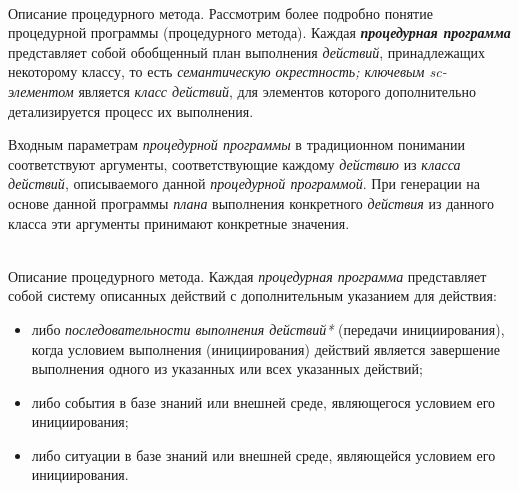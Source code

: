 \begin{frame}{\\Описание процедурного метода.}
	\topline
	\justifying
    Рассмотрим более подробно понятие процедурной программы (процедурного метода). Каждая \textbf{\textit{процедурная программа}} представляет собой обобщенный план выполнения \textit{действий}, принадлежащих некоторому классу, то есть \textit{семантическую окрестность; ключевым sc-элементом\scnrolesign} является \textit{класс действий}, для элементов которого дополнительно детализируется процесс их выполнения.
    
    Входным параметрам \textit{процедурной программы} в традиционном понимании соответствуют аргументы, соответствующие каждому \textit{действию} из \textit{класса действий}, описываемого данной \textit{процедурной программой}. При генерации на основе данной программы \textit{плана} выполнения конкретного \textit{действия} из данного класса эти аргументы принимают конкретные значения.
\end{frame}

\begin{frame}{\\Описание процедурного метода.}
	\topline
	\justifying
     Каждая \textit{процедурная программа} представляет собой систему описанных действий с дополнительным указанием для действия:
    \begin{itemize}
        \item либо \textit{последовательности выполнения действий*} (передачи инициирования), когда условием выполнения (инициирования) действий является завершение выполнения одного из указанных или всех указанных действий;
        \item либо события в базе знаний или внешней среде, являющегося условием его инициирования;
        \item либо ситуации в базе знаний или внешней среде, являющейся условием его инициирования.
    \end{itemize}
\end{frame}

	

	

